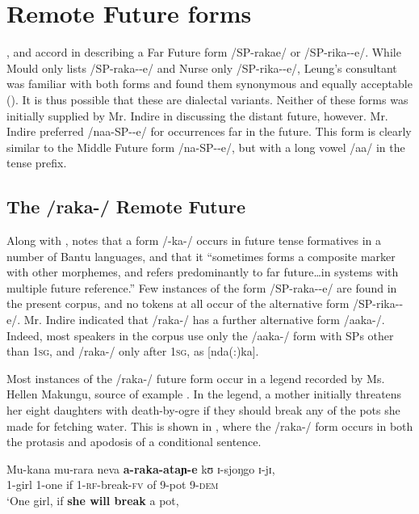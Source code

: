 \documentclass[output=paper]{langsci/langscibook}
\begin{document}
\section[Remote Future forms]{Remote Future forms} \label{sec:sarvasy:6}
\citet{Mould1981}, \citet{Leung1991} and \citet{Nurse2003aspect} accord in describing a Far Future %
%
form /SP-raka{\longrule}e/ or /SP-rika-{\longrule}-e/. While Mould only lists /SP-raka-{\longrule}-e/ and Nurse only /SP-rika-{\longrule}-e/, Leung’s consultant was familiar with both forms and found them synonymous and equally acceptable (\citeyear[204, fn 10]{Leung1991}). It is thus possible that these are dialectal variants. Neither of these forms was initially supplied by Mr. Indire in discussing the distant future, however. Mr. Indire preferred /naa-SP-{\longrule}-e/ for occurrences far in the future. This form is clearly similar to the Middle Future form /na-SP-{\longrule}-e/, but with a long vowel /aa/ in the tense prefix. 

\subsection{The /raka-/ Remote Future}\label{sec:sarvasy:6.1}

Along with \citet{Botne1999}, \citet[85]{Nurse2008} notes that a form /-ka-/ occurs in future tense formatives in a number of Bantu languages, and that it “sometimes forms a composite marker with other morphemes, and refers predominantly to far future\ldots in systems with multiple future reference.” Few instances of the form /SP-raka-{\longrule}-e/ are found in the present corpus, and no tokens at all occur of the alternative form /SP-rika-{\longrule}-e/. Mr. Indire indicated that /raka-/ has a further alternative form /aaka-/. Indeed, most speakers in the corpus use only the /aaka-/ form with SPs other than \textsc{1sg}, and /raka-/ only after \textsc{1sg}, as [nda(:)ka].

Most instances of the /raka-/ future form occur in a legend recorded by Ms. Hellen Makungu, source of example . In the legend, a mother initially threatens her eight daughters with death-by-ogre if they should break any of the pots she made for fetching water. This is shown in , where the /raka-/ form occurs in both the protasis and apodosis of a conditional sentence. 

\ea\label{ex:sarvasy:14}
\gll Mu-kana   mu-rara   neva   \textbf{a-raka-ataɲ-e}   kʊ     ɪ-sjoŋgo   ɪ-jɪ,  \\
1-girl    1-one    if  1-\textsc{rf}-break-\textsc{fv}  of  9-pot   9-\textsc{dem} \\
\glt ‘One girl, if \textbf{she will break} a pot,
\end{document}

